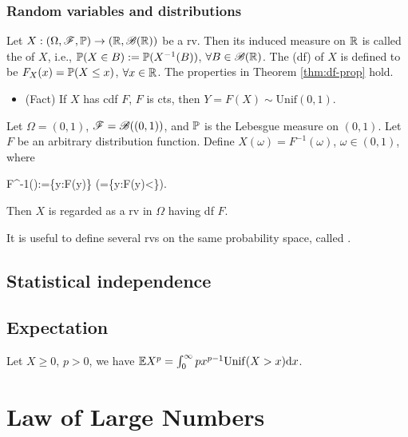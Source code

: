 \documentclass[10pt,a4paper]{article}
\begin{document}
\subsubsection{Random variables and distributions}\label{sec:rv-dist}
Let $X:(\Omega,\mathscr{F},\mathbb P)\to(\mathbb R,\mathscr{B}(\mathbb R))$ be a rv. Then its induced measure on $\mathbb R$ is called the  of $X$, i.e., $\mathbb P(X\in B):=\mathbb P(X^{-1}(B))$, $\forall B\in\mathscr{B}(\mathbb R)$. The  (df) of $X$ is defined to be $F_X(x)=\mathbb P(X\leq x)$, $\forall x\in\mathbb R$. The properties in Theorem \ref{thm:df-prop} hold.
\begin{itemize}
	\item (Fact) If $X$ has cdf $F$, $F$ is cts, then $Y=F(X)\sim\mathrm{Unif}(0,1)$.    
\end{itemize}
\begin{thmbox}
	\begin{theorem}\label{thm:dist-coupling}\rm
		Let $\Omega=(0,1)$, $\mathscr{F}=\mathscr{B}((0,1))$, and $\mathbb P$ is the Lebesgue measure on $(0,1)$. Let $F$ be an arbitrary distribution function. 
		Define $X(\omega)=F^{-1}(\omega)$, $\omega\in(0,1)$, where 
		\begin{sequation*}
			F^{-1}(\omega):=\inf\{y\in\bbR:F(y)\geq \omega\} (=\sup\{y\in\bbR:F(y)<\omega\}).
		\end{sequation*}
		Then $X$ is regarded as a rv in $\Omega$ having df $F$.            
	\end{theorem}
\end{thmbox}
It is useful to define several rvs on the same probability space, called .

\subsection{Statistical independence}\label{sec:independence}



\subsection{Expectation}\label{sec:measure-expectation}
\begin{lemma}\label{lamma:measure-expectation-expInt}
	Let $X\geq 0$, $p>0$, we have $\mathbb E X^p=\int_{0}^{\infty }px^{p-1}\mathrm{Unif}(X>x) \mathrm{d} x$.
\end{lemma}



\section{Law of Large Numbers}\label{sec:LLN}
\end{document}
